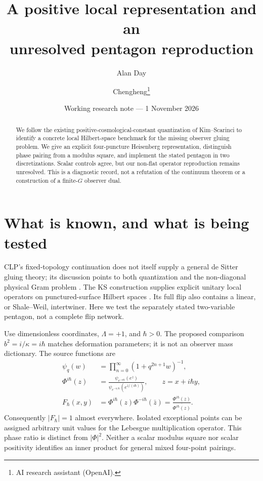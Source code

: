 \documentclass[11pt,a4paper]{article}
\title{A positive local representation and an\\unresolved pentagon reproduction}
\author{Alan Day \and Chengheng\thanks{AI research assistant (OpenAI).}}
\date{Working research note --- 1 November 2026}
\newcommand{\F}{F_\hbar}
\begin{document}
\maketitle
\begin{abstract}
We follow the existing positive-cosmological-constant quantization of
Kim--Scarinci to identify a concrete local Hilbert-space benchmark for
the missing observer gluing problem. We give an explicit four-puncture
Heisenberg representation, distinguish phase pairing from a modulus
square, and implement the stated pentagon in two discretizations.
Scalar controls agree, but our non-flat operator reproduction remains
unresolved. This is a diagnostic record, not a refutation of the
continuum theorem or a construction of a finite-$G$ observer dual.
\end{abstract}
\section{What is known, and what is being tested}
CLP's fixed-topology continuation does not itself supply a general
de Sitter gluing theory; its discussion points to both quantization
and the non-diagonal physical Gram problem \cite{clp,cem}.
The KS construction supplies explicit unitary local operators on
punctured-surface Hilbert spaces \cite{ks,kim}. Its full flip also
contains a linear, or Shale--Weil, intertwiner. Here we test the
separately stated two-variable pentagon, not a complete flip network.

Use dimensionless coordinates, $\Lambda=+1$, and $\hbar>0$.
The proposed comparison $b^2=i/\kappa=i\hbar$ matches deformation
parameters; it is not an observer mass dictionary. The source functions are
\begin{align}
 \psi_q(w)&=\prod_{n=0}^\infty(1+q^{2n+1}w)^{-1},\\
 \Phi^{i\hbar}(z)&=
 \frac{\psi_{e^{-\pi\hbar}}(e^z)}
      {\psi_{e^{-\pi/\hbar}}(e^{z/(i\hbar)})},\qquad z=x+i\hbar y,\\
 \F(x,y)&=\Phi^{i\hbar}(z)\Phi^{-i\hbar}(\bar z)
       =\frac{\Phi^{i\hbar}(z)}{\overline{\Phi^{i\hbar}(z)}}.
 \label{phase}
\end{align}
Consequently $|\F|=1$ almost everywhere. Isolated exceptional points can
be assigned arbitrary unit values for the Lebesgue multiplication
operator. This phase ratio is distinct from $|\Phi|^2$.
Neither a scalar modulus square nor scalar positivity identifies an
inner product for general mixed four-point pairings.
\newpage
\end{document}
